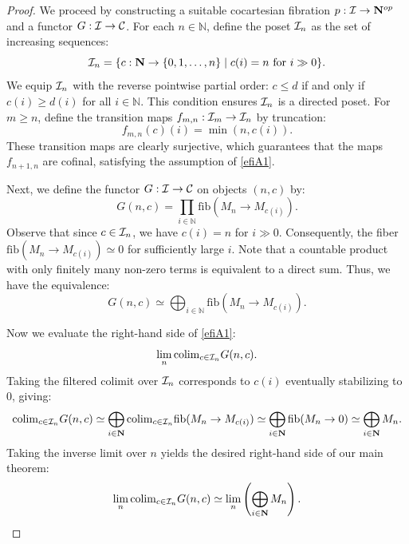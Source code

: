 \documentclass[a4paper,10pt, oneside]{amsart}
\begin{document}
\begin{proof}
 We proceed by constructing a suitable cocartesian fibration $p: \mathcal{I} \to \mathbf{N}^{op}$ and a functor $G: \mathcal{I} \to \mathcal{C}$.
	For each $n \in \mathbb{N}$, define the poset $\mathcal{I}_n$ as the set of increasing sequences:
	$$\mathcal{I}_n = \{c: \mathbf{N} \to \{0, 1, \dots, n\} \mid c(i) = n \text{ for } i \gg 0\}.$$
	We equip $\mathcal{I}_n$ with the reverse pointwise partial order: $c \leq d$ if and only if $c(i) \geq d(i)$ for all $i \in \mathbb{N}$. This condition ensures $\mathcal{I}_n$ is a directed poset.
	For $m \geq n$, define the transition maps $f_{m,n}: \mathcal{I}_m \to \mathcal{I}_n$ by truncation:
	$$f_{m,n}(c)(i) = \min(n, c(i)).$$
	These transition maps are clearly surjective, which guarantees that the maps $f_{n+1,n}$ are cofinal, satisfying the assumption of \cref{efiA1}.
	
	Next, we define the functor $G: \mathcal{I} \to \mathcal{C}$ on objects $(n, c)$ by:
	$$G(n, c) = \prod_{i \in \mathbb{N}} \mathrm{fib}(M_n \to M_{c(i)}).$$
	Observe that since $c \in \mathcal{I}_n$, we have $c(i) = n$ for $i \gg 0$. Consequently, the fiber $\mathrm{fib}(M_n \to M_{c(i)}) \simeq 0$ for sufficiently large $i$. Note that a countable product with only finitely many non-zero terms is equivalent to a direct sum. Thus, we have the equivalence:
	$$G(n, c) \simeq \bigoplus_{i \in \mathbb{N}} \mathrm{fib}(M_n \to M_{c(i)}).$$
	
	Now we evaluate the right-hand side  of \cref{efiA1}:
	\[
	 \lim_n \mathrm{colim}_{c \in \mathcal{I}_n} G(n, c).
	\]
	Taking the filtered colimit over \(\mathcal{I}_n\) corresponds to \(c(i)\) eventually stabilizing to \(0\), giving:
	\[
	\mathrm{colim}_{c \in \mathcal{I}_n} G(n, c)
	\simeq
	\bigoplus_{i \in \mathbf{N}}
	\mathrm{colim}_{c \in \mathcal{I}_n}
	\mathrm{fib}(M_n \to M_{c(i)})
	\simeq
	\bigoplus_{i \in \mathbf{N}}
	\mathrm{fib}(M_n \to 0)
	\simeq
	\bigoplus_{i \in \mathbf{N}} M_n.
	\]
	Taking the inverse limit over \(n\) yields the desired right-hand side of our main theorem:
	\[
\lim_n \mathrm{colim}_{c \in \mathcal{I}_n} G(n, c) \simeq \lim_n \left( \bigoplus_{i \in \mathbf{N}} M_n \right).
	\]
	

\end{proof}
\end{document}
